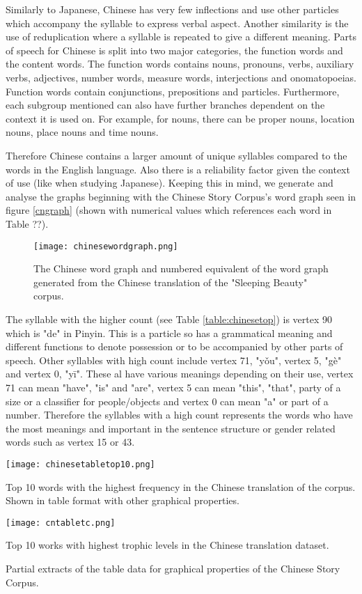 Similarly to Japanese, Chinese has very few inflections and use other particles which accompany the syllable to express verbal aspect. Another similarity is the use of reduplication where a syllable is repeated to give a different meaning. Parts of speech for Chinese is split into two major categories, the function words and the content words. The function words contains nouns, pronouns, verbs, auxiliary verbs, adjectives, number words, measure words, interjections and onomatopoeias. Function words contain conjunctions, prepositions and particles. Furthermore, each subgroup mentioned can also have further branches dependent on the context it is used on. For example, for nouns, there can be proper nouns, location nouns, place nouns and time nouns.

Therefore Chinese contains a larger amount of unique syllables compared to the words in the English language. Also there is a reliability factor given the context of use (like when studying Japanese). Keeping this in mind, we generate and analyse the graphs beginning with the Chinese Story Corpus's word graph seen in figure \ref{cngraph} (shown with numerical values which references each word in Table ??).

\begin{figure}[H]
\centering
\texttt{[image: chinesewordgraph.png]}
\caption{The Chinese word graph and numbered equivalent of the word graph generated from the Chinese translation of the "Sleeping Beauty" corpus.}
\label{fig:cngraph}
\end{figure}

The syllable with the higher count (see Table \ref{table:chinesetop}) is vertex 90 which is "de" in Pinyin. This is a particle so has a grammatical meaning and different functions to denote possession or to be accompanied by other parts of speech. Other syllables with high count include vertex 71, "yǒu", vertex 5, "gè" and vertex 0, "yī". These al have various meanings depending on their use, vertex 71 can mean "have", "is" and "are", vertex 5 can mean "this", "that", party of a size or a classifier for people/objects and vertex 0 can mean "a" or part of a number. Therefore the syllables with a high count represents the words who have the most meanings and important in the sentence structure or gender related words such as vertex 15 or 43.

\begin{table}[H]
\centering
\begin{subtable}{.45\textwidth}
	\texttt{[image: chinesetabletop10.png]}
	\caption{Top 10 words with the highest frequency in the Chinese translation of the corpus. Shown in table format with other graphical properties. }
	\label{table:chinesetop}
\end{subtable}
\hfill
\begin{subtable}{.45\textwidth}
	\hspace{1.5cm} 
	\texttt{[image: cntabletc.png]}
	\caption{Top 10 works with highest trophic levels in the Chinese translation dataset.}
	\label{table:chinesetoptc}
\end{subtable}
\caption{Partial extracts of the table data for graphical properties of the Chinese Story Corpus.}
\end{table}

